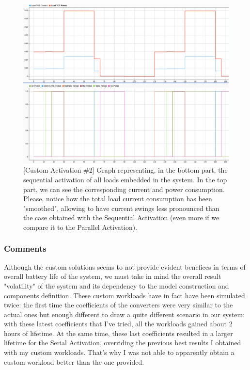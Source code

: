 \documentclass[a4paper]{article}
\begin{document}
        \begin{figure}[htp]
            \centering
            \includegraphics[width=1 \columnwidth]{./screenshots/SmartActiv/2Minutes/SmartLoadAndTOTPowerCurrent.png}
            \caption{
                    \label{fig:SmartLoadAndTOTPowerCurrent}
                    [Custom Activation \#2] Graph representing, in the bottom part, the sequential activation of all loads embedded in the system. In the top part, we can see the corresponding current and power consumption.
                    Please, notice how the total load current consumption has been "smoothed", allowing to have current swings less pronounced than the case obtained with the Sequential Activation (even more if we compare it to the Parallel Activation).
            }
        \end{figure}

        \subsubsection{Comments}
        Although the custom solutions seems to not provide evident benefices in terms of overall battery life of the system, we must take in mind the overall result "volatility" of the system and its dependency to the model construction and components definition. 
        These custom workloads have in fact have been simulated twice: the first time the coefficients of the converters were very similar to the actual ones but enough different to draw a quite different scenario in our system: with these latest coefficients that I've tried, all the workloads gained about 2 hours of lifetime. At the same time, these last coefficients resulted in a larger lifetime for the Serial Activation, overriding the previous best results I obtained with my custom workloads. That's why I was not able to apparently obtain a custom workload better than the one provided.
\end{document}
